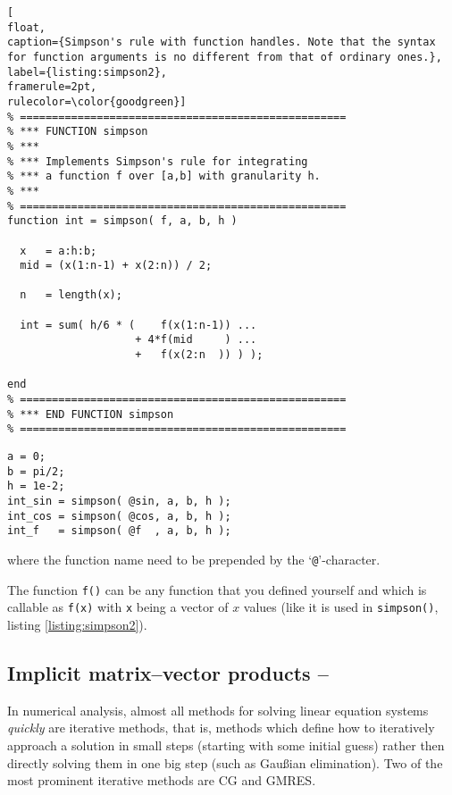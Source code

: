 \begin{lstlisting}[
float,
caption={Simpson's rule with function handles. Note that the syntax for function arguments is no different from that of ordinary ones.},
label={listing:simpson2},
framerule=2pt,
rulecolor=\color{goodgreen}]
% ===================================================
% *** FUNCTION simpson
% ***
% *** Implements Simpson's rule for integrating
% *** a function f over [a,b] with granularity h.
% ***
% ===================================================
function int = simpson( f, a, b, h )

  x   = a:h:b;
  mid = (x(1:n-1) + x(2:n)) / 2;

  n   = length(x);

  int = sum( h/6 * (    f(x(1:n-1)) ...
                    + 4*f(mid     ) ...
                    +   f(x(2:n  )) ) );

end 
% ===================================================
% *** END FUNCTION simpson
% ===================================================
\end{lstlisting}

\hfill
\begin{minipage}[t]{.90\textwidth}
\begin{lstlisting}[framerule=1pt,rulecolor=\color{goodgreen}]
a = 0;
b = pi/2;
h = 1e-2;
int_sin = simpson( @sin, a, b, h );
int_cos = simpson( @cos, a, b, h );
int_f   = simpson( @f  , a, b, h );
\end{lstlisting}
\end{minipage}
\hfill

where the function name need to be prepended by the `\lstinline!@!'-character.

The function \lstinline!f()! can be any function that you defined yourself and which is callable as \lstinline!f(x)! with \lstinline!x! being a vector of $x$ values (like it is used in \lstinline!simpson()!, listing \ref{listing:simpson2}).



\subsection{Implicit matrix--vector products -- \cleansymbol}

In numerical analysis, almost all methods for solving linear equation systems \emph{quickly} are iterative methods, that is, methods which define how to iteratively approach a solution in small steps (starting with some initial guess) rather then directly solving them in one big step (such as Gau{\ss}ian elimination). Two of the most prominent iterative methods are CG and GMRES.


